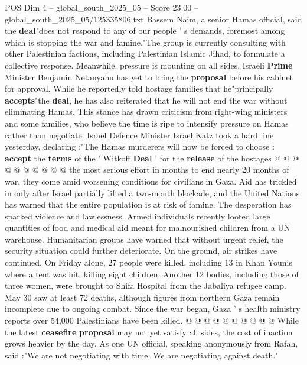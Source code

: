 \begin{textsample}{POS Dim 4 – global\_south\_2025\_05 – Score 23.00 – global\_south\_2025\_05/125335806.txt}
Bassem Naim, a senior Hamas official, said the \textbf{deal}"does not respond to any of our people ' s demands, foremost among which is stopping the war and famine."The group is currently consulting with other Palestinian factions, including Palestinian Islamic Jihad, to formulate a collective response.
Meanwhile, pressure is mounting on all sides.
Israeli \textbf{Prime} Minister Benjamin Netanyahu has yet to bring the \textbf{proposal} before his cabinet for approval.
While he reportedly told hostage families that he"principally \textbf{accepts}"the \textbf{deal}, he has also reiterated that he will not end the war without eliminating Hamas.
This stance has drawn criticism from right-wing ministers and some families, who believe the time is ripe to intensify pressure on Hamas rather than negotiate.
Israel Defence Minister Israel Katz took a hard line yesterday, declaring :"The Hamas murderers will now be forced to choose : \textbf{accept} the \textbf{terms} of the ' Witkoff \textbf{Deal} ' for the \textbf{release} of the hostages @ @ @ @ @ @ @ @ @ @ the most serious effort in months to end nearly 20 months of war, they come amid worsening conditions for civilians in Gaza.
Aid has trickled in only after Israel partially lifted a two-month blockade, and the United Nations has warned that the entire population is at risk of famine.
The desperation has sparked violence and lawlessness.
Armed individuals recently looted large quantities of food and medical aid meant for malnourished children from a UN warehouse.
Humanitarian groups have warned that without urgent relief, the security situation could further deteriorate.
On the ground, air strikes have continued.
On Friday alone, 27 people were killed, including 13 in Khan Younis where a tent was hit, killing eight children.
Another 12 bodies, including those of three women, were brought to Shifa Hospital from the Jabaliya refugee camp.
May 30 saw at least 72 deaths, although figures from northern Gaza remain incomplete due to ongoing combat.
Since the war began, Gaza ' s health ministry reports over 54,000 Palestinians have been killed, @ @ @ @ @ @ @ @ @ @ While the latest \textbf{ceasefire} \textbf{proposal} may not yet satisfy all sides, the cost of inaction grows heavier by the day.
As one UN official, speaking anonymously from Rafah, said :"We are not negotiating with time.
We are negotiating against death."

\end{textsample}

